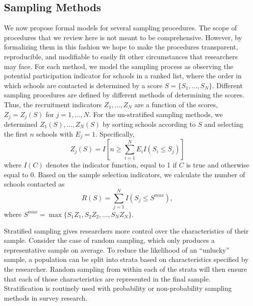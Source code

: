 \documentclass[
  english,
  man,floatsintext]{apa6}
\begin{document}
\hypertarget{sampling-methods}{%
\subsection{Sampling Methods}\label{sampling-methods}}

We now propose formal models for several sampling procedures. The scope of procedures that we review here is not meant to be comprehensive. However, by formalizing them in this fashion we hope to make the procedures transparent, reproducible, and modifiable to easily fit other circumstances that researchers may face.
For each method, we model the sampling process as observing the potential participation indicator for schools in a ranked list, where the order in which schools are contacted is determined by a score \(S = \{S_1,...,S_N\}\). Different sampling procedures are defined by different methods of determining the scores. Thus, the recruitment indicators \(Z_1,...,Z_N\) are a function of the scores, \(Z_j = Z_j(S)\) for \(j = 1,...,N\).
For the un-stratified sampling methods, we determined \(Z_1(S),...,Z_N(S)\) by sorting schools according to \(S\) and selecting the first \(n\) schools with \(E_j = 1\).
Specifically,
\begin{equation}
\label{eq:Zj}
Z_j(S) = I\left[n \geq \sum_{i=1}^N E_i I\left(S_i \leq S_j\right)\right]
\end{equation}
where \(I(C)\) denotes the indicator function, equal to 1 if \(C\) is true and otherwise equal to 0. Based on the sample selection indicators, we calculate the number of schools contacted as
\begin{equation}
\label{eq:R}
R(S) = \sum_{j=1}^N I\left(S_j \leq S^{max}\right),
\end{equation}
where \(S^{max} = \max \{S_1 Z_1, S_2 Z_2, ..., S_N Z_N\}\).

Stratified sampling gives researchers more control over the characteristics of their sample. Consider the case of random sampling, which only produces a representative sample on average. To reduce the likelihood of an ``unlucky'' sample, a population can be split into strata based on characteristics specified by the researcher. Random sampling from within each of the strata will then ensure that each of those characteristics are represented in the final sample. Stratification is routinely used with probability or non-probability sampling methods in survey research.
\end{document}
